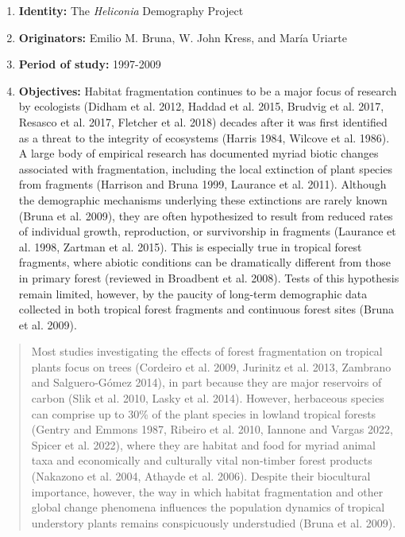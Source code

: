 \documentclass[
  12pt,
  man, donotrepeattitle,floatsintext]{apa6}
\begin{document}
\begin{enumerate}
\def\labelenumi{\arabic{enumi}.}
\item
  \textbf{Identity:} The \emph{Heliconia} Demography Project
\item
  \textbf{Originators:} Emilio M. Bruna, W. John Kress, and María Uriarte
\item
  \textbf{Period of study:} 1997-2009
\item
  \textbf{Objectives:} Habitat fragmentation continues to be a major focus of research by ecologists (Didham et al. 2012, Haddad et al. 2015, Brudvig et al. 2017, Resasco et al. 2017, Fletcher et al. 2018) decades after it was first identified as a threat to the integrity of ecosystems (Harris 1984, Wilcove et al. 1986). A large body of empirical research has documented myriad biotic changes associated with fragmentation, including the local extinction of plant species from fragments (Harrison and Bruna 1999, Laurance et al. 2011). Although the demographic mechanisms underlying these extinctions are rarely known (Bruna et al. 2009), they are often hypothesized to result from reduced rates of individual growth, reproduction, or survivorship in fragments (Laurance et al. 1998, Zartman et al. 2015). This is especially true in tropical forest fragments, where abiotic conditions can be dramatically different from those in primary forest (reviewed in Broadbent et al. 2008). Tests of this hypothesis remain limited, however, by the paucity of long-term demographic data collected in both tropical forest fragments and continuous forest sites (Bruna et al. 2009).
\end{enumerate}

\begin{quote}
Most studies investigating the effects of forest fragmentation on tropical plants focus on trees (Cordeiro et al. 2009, Jurinitz et al. 2013, Zambrano and Salguero-Gómez 2014), in part because they are major reservoirs of carbon (Slik et al. 2010, Lasky et al. 2014). However, herbaceous species can comprise up to 30\% of the plant species in lowland tropical forests (Gentry and Emmons 1987, Ribeiro et al. 2010, Iannone and Vargas 2022, Spicer et al. 2022), where they are habitat and food for myriad animal taxa and economically and culturally vital non-timber forest products (Nakazono et al. 2004, Athayde et al. 2006). Despite their biocultural importance, however, the way in which habitat fragmentation and other global change phenomena influences the population dynamics of tropical understory plants remains conspicuously understudied (Bruna et al. 2009).
\end{quote}
\end{document}

